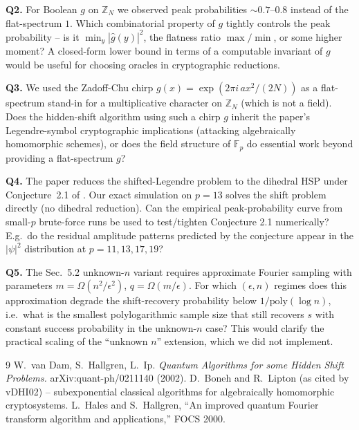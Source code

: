 \documentclass[11pt]{article}
\begin{document}
\textbf{Q2.} For Boolean $g$ on $\mathbb{Z}_N$ we observed peak
probabilities $\sim 0.7$--$0.8$ instead of the flat-spectrum $1$.
Which combinatorial property of $g$ tightly controls the peak
probability -- is it $\min_y |\hat g(y)|^2$, the flatness ratio
$\max/\min$, or some higher moment?  A closed-form lower bound in
terms of a computable invariant of $g$ would be useful for choosing
oracles in cryptographic reductions.

\textbf{Q3.} We used the Zadoff-Chu chirp $g(x)=\exp(2\pi i\, a x^2/(2N))$
as a flat-spectrum stand-in for a multiplicative character on
$\mathbb{Z}_N$ (which is not a field).  Does the hidden-shift algorithm
using such a chirp $g$ inherit the paper's Legendre-symbol
cryptographic implications (attacking algebraically homomorphic
schemes), or does the field structure of $\mathbb{F}_p$ do essential
work beyond providing a flat-spectrum $g$?

\textbf{Q4.} The paper reduces the shifted-Legendre problem to the
dihedral HSP under Conjecture~2.1 of \cite{DKPP96}.  Our exact
simulation on $p=13$ solves the shift problem directly (no dihedral
reduction).  Can the empirical peak-probability curve from small-$p$
brute-force runs be used to test/tighten Conjecture 2.1 numerically?
E.g.\ do the residual amplitude patterns predicted by the conjecture
appear in the $|\psi|^2$ distribution at $p=11, 13, 17, 19$?

\textbf{Q5.} The Sec.~5.2 unknown-$n$ variant requires approximate
Fourier sampling with parameters $m=\Omega(n^2/\epsilon^2)$,
$q=\Omega(m/\epsilon)$.  For which $(\epsilon, n)$ regimes does this
approximation degrade the shift-recovery probability below
$1/\mathrm{poly}(\log n)$, i.e.\ what is the smallest polylogarithmic
sample size that still recovers $s$ with constant success
probability in the unknown-$n$ case?  This would clarify the
practical scaling of the ``unknown $n$'' extension, which we did not
implement.

\begin{thebibliography}{9}
 W.\ van Dam, S.\ Hallgren, L.\ Ip.
\emph{Quantum Algorithms for some Hidden Shift Problems.}
arXiv:quant-ph/0211140 (2002).
 D.\ Boneh and R.\ Lipton (as cited by vDHI02) --
subexponential classical algorithms for algebraically homomorphic
cryptosystems.
 L.\ Hales and S.\ Hallgren, ``An improved quantum
Fourier transform algorithm and applications,'' FOCS 2000.
\end{thebibliography}
\end{document}
